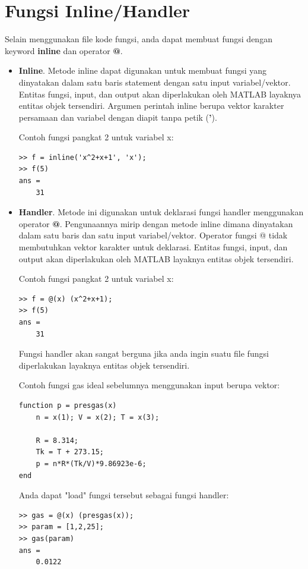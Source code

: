 \documentclass[12pt]{book}
\begin{document}
	\section{Fungsi Inline/Handler}

	Selain menggunakan file kode fungsi, anda dapat membuat fungsi dengan keyword \textbf{inline} dan operator \textbf{@}.

	\begin{itemize}
		\item \textbf{Inline}. Metode inline dapat digunakan untuk membuat fungsi yang dinyatakan dalam satu baris statement dengan satu input variabel/vektor.
		Entitas fungsi, input, dan output akan diperlakukan oleh MATLAB layaknya entitas objek tersendiri.
		Argumen perintah inline berupa vektor karakter persamaan dan variabel dengan diapit tanpa petik (\textbf{'}).

		Contoh fungsi pangkat 2 untuk variabel x:
		\begin{verbatim}
>> f = inline('x^2+x+1', 'x');
>> f(5)
ans =
    31
		\end{verbatim}

		\item \textbf{Handler}. Metode ini digunakan untuk deklarasi fungsi handler menggunakan operator \textbf{@}.
		Pengunaannya mirip dengan metode inline dimana dinyatakan dalam satu baris dan satu input variabel/vektor.
		Operator fungsi @ tidak membutuhkan vektor karakter untuk deklarasi.
		Entitas fungsi, input, dan output akan diperlakukan oleh MATLAB layaknya entitas objek tersendiri.

		\newpage
		Contoh fungsi pangkat 2 untuk variabel x:
		\begin{verbatim}
>> f = @(x) (x^2+x+1);
>> f(5)
ans =
    31
		\end{verbatim}

		Fungsi handler akan sangat berguna jika anda ingin suatu file fungsi diperlakukan layaknya entitas objek tersendiri.

		Contoh fungsi gas ideal sebelumnya menggunakan input berupa vektor:
		\begin{verbatim}
function p = presgas(x)
	n = x(1); V = x(2); T = x(3);

	R = 8.314;
	Tk = T + 273.15;
	p = n*R*(Tk/V)*9.86923e-6;
end
		\end{verbatim}

		Anda dapat "load" fungsi tersebut sebagai fungsi handler:
		\begin{verbatim}
>> gas = @(x) (presgas(x));
>> param = [1,2,25];
>> gas(param)
ans =
    0.0122
		\end{verbatim}
	\end{itemize}
\end{document}
